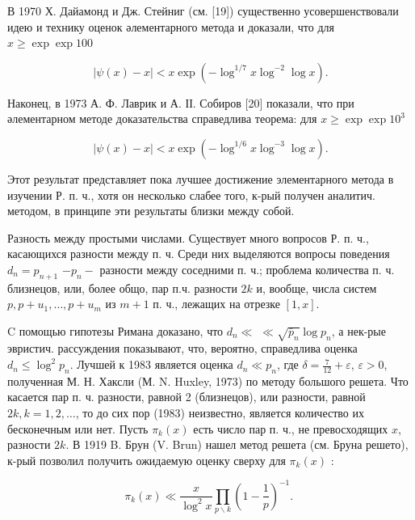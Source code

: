 \documentclass[10pt]{article}
\begin{document}
В 1970 Х. Дайамонд и Дж. Стейниг (см. [19]) существенно усовершенствовали идею и технику оценок әлементарного метода и доказали, что для $x \geqslant \exp \exp 100$



\[

|\psi(x)-x|<x \exp \left(-\log ^{1 / 7} x \log ^{-2} \log x\right) .

\]



Наконец, в 1973 А. Ф. Лаврик и А. ІІ. Собиров [20] показали, что при әлементарном методе доказательства справедлива теорема: для $x \geqslant \exp \exp 10^{3}$



\[

|\psi(x)-x|<x \exp \left(-\log ^{1 / 6} x \log ^{-3} \log x\right) .

\]



Этот результат представляет пока лучшее достижение элементарного метода в изучении Р. п. ч., хотя он несколько слабее того, к-рый получен аналитич. методом, в принципе эти результаты близки между собой.



Разность между простыми числами. Существует много вопросов Р. п. ч., касающихся разности между п. ч. Среди них выделяются вопросы поведения $d_{n}=p_{n+1}$ $-p_{n}-$ разности между соседними п. ч.; проблема количества п. ч. близнецов, или, более общо, пар п.ч. разности $2 k$ и, вообще, числа систем $p, p+u_{1}, \ldots, p+u_{m}$ из $m+1$ п. ч., лежащих на отрезке $[1, x]$.



$\mathrm{C}$ помощью гипотезы Римана доказано, что $d_{n} \ll$ $\ll \sqrt{\bar{p}_{n}} \log p_{n}$, а нек-рые эвристич. рассуждения показывают, что, вероятно, справедлива оценка $d_{n} \leqslant \log ^{2} p_{n}$. Лучшей к 1983 является оценка $d_{n} \ll p_{n}$, где $\delta=\frac{7}{12}+\varepsilon$, $\varepsilon>0$, полученная М. Н. Хаксли (М. N. Huxley, 1973) по методу большого решета. Что касается пар п. ч. разности, равной 2 (близнецов), или разности, равной $2 k, k=1,2, \ldots$, то до сих пор (1983) неизвестно, является количество их бесконечным или нет. Пусть $\pi_{k}(x)$ есть число пар п. ч., не превосходящих $x$, разности $2 k$. В 1919 B. Брун (V. Brun) нашел метод решета (см. Бруна решето), к-рый позволил получить ожидаемую оценку сверху для $\pi_{k}(x)$ :



\[

\pi_{k}(x) \ll \frac{x}{\log ^{2} x} \prod_{p \backslash k}\left(1-\frac{1}{p}\right)^{-1} \text {. }

\]
\end{document}
